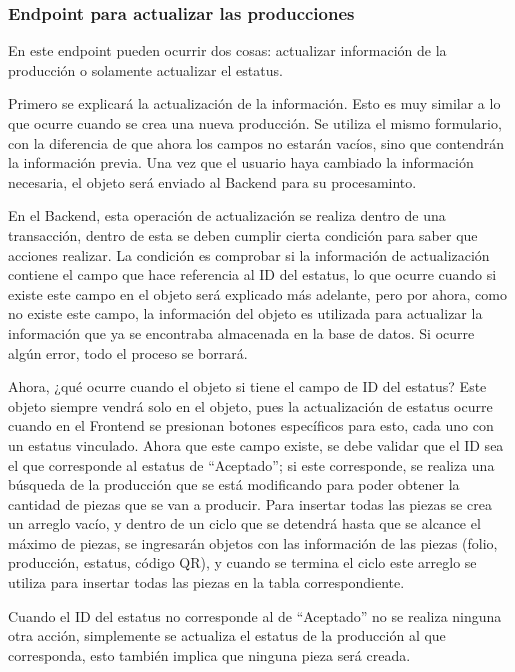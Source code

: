 \subsubsection{Endpoint para actualizar las producciones}
En este endpoint pueden ocurrir dos cosas: actualizar información de la producción o solamente actualizar el estatus.

Primero se explicará la actualización de la información. Esto es muy similar a lo que ocurre cuando se crea una nueva producción. Se utiliza el mismo formulario, con la diferencia de que ahora los campos no estarán vacíos, sino que contendrán la información previa. Una vez que el usuario haya cambiado la información necesaria, el objeto será enviado al Backend para su procesaminto.

En el Backend, esta operación de actualización se realiza dentro de una transacción, dentro de esta se deben cumplir cierta condición para saber que acciones realizar. La condición es comprobar si la información de actualización contiene el campo que hace referencia al ID del estatus, lo que ocurre cuando si existe este campo en el objeto será explicado más adelante, pero por ahora, como no existe este campo, la información del objeto es utilizada para actualizar la información que ya se encontraba almacenada en la base de datos. Si ocurre algún error, todo el proceso se borrará.

Ahora, ¿qué ocurre cuando el objeto si tiene el campo de ID del estatus? Este objeto siempre vendrá solo en el objeto, pues la actualización de estatus ocurre cuando en el Frontend se presionan botones específicos para esto, cada uno con un estatus vinculado. Ahora que este campo existe, se debe validar que el ID sea el que corresponde al estatus de ``Aceptado''; si este corresponde, se realiza una búsqueda de la producción que se está modificando para poder obtener la cantidad de piezas que se van a producir. Para insertar todas las piezas se crea un arreglo vacío, y dentro de un ciclo que se detendrá hasta que se alcance el máximo de piezas, se ingresarán objetos con las información de las piezas (folio, producción, estatus, código QR), y cuando se termina el ciclo este arreglo se utiliza para insertar todas las piezas en la tabla correspondiente.

Cuando el ID del estatus no corresponde al de ``Aceptado'' no se realiza ninguna otra acción, simplemente se actualiza el estatus de la producción al que corresponda, esto también implica que ninguna pieza será creada. 
